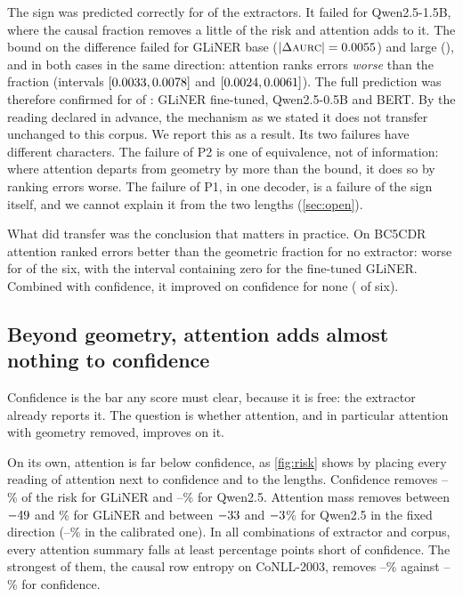 \documentclass[11pt,a4paper]{article}
\newcommand{\gliner}{GLiNER}
\newcommand{\aurc}{\textsc{aurc}}
\begin{document}
The sign was predicted correctly for \predPoneOk{} of the \predN{} extractors. It failed for Qwen2.5-1.5B, where the
causal fraction removes a little of the risk and attention adds to it. The bound on the difference failed for \gliner{} base
($|\Delta\aurc|=\bcBaseGap$) and large (\bcLargeGap), and in both cases in the same direction: attention ranks errors
\emph{worse} than the fraction (intervals $[0.0033, 0.0078]$ and $[0.0024, 0.0061]$). The
full prediction was therefore confirmed for \predConfirmed{} of \predN{}: \gliner{} fine-tuned, Qwen2.5-0.5B and BERT. By
the reading declared in advance, the mechanism as we stated it does not transfer unchanged to this corpus. We report this as
a result. Its two failures have different characters. The failure of P2 is one of equivalence, not of information: where
attention departs from geometry by more than the bound, it does so by ranking errors worse. The failure of P1, in one
decoder, is a failure of the sign itself, and we cannot explain it from the two lengths (\cref{sec:open}).

What did transfer was the conclusion that matters in practice. On BC5CDR attention ranked errors better than the geometric
fraction for no extractor: worse for \bcCtwoAdv{} of the six, with the interval containing zero for the fine-tuned
\gliner{}. Combined with confidence, it improved on confidence for none (\bcCthreeFav{} of six).

\subsection{Beyond geometry, attention adds almost nothing to confidence}
\label{sec:res-confidence}

Confidence is the bar any score must clear, because it is free: the extractor already reports it. The question is whether
attention, and in particular attention with geometry removed, improves on it.

On its own, attention is far below confidence, as \cref{fig:risk} shows by placing every reading of attention next to
confidence and to the lengths. Confidence removes \rrEncConfMin--\rrEncConfMax\% of the risk for \gliner{} and
\rrDecConfMin--\rrDecConfMax\% for Qwen2.5. Attention mass removes between $-49$ and \rrEncMassMax\% for \gliner{}
and between $-33$ and $-3$\% for Qwen2.5 in the fixed direction (\rrDecMassCalMin--\rrDecMassCalMax\% in
the calibrated one). In all \nAttCells{} combinations of extractor and corpus, every attention summary falls at least
\rrAttBelowConfMin{} percentage points short of confidence. The strongest of them, the causal row entropy on CoNLL-2003,
removes \rrDecEntConllMin--\rrDecEntConllMax\% against \rrDecConfConllMin--\rrDecConfConllMax\% for confidence.
\end{document}
